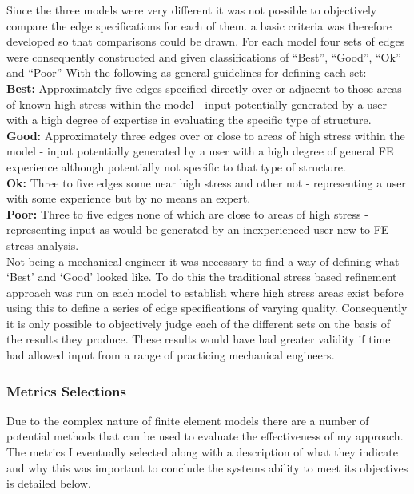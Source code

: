 \noindent
Since the three models were very different it was not possible to objectively compare the edge specifications for each of them. a basic criteria was therefore developed so that comparisons could be drawn. For each model four sets of edges were consequently constructed and given classifications of ``Best'', ``Good'', ``Ok'' and ``Poor'' With the following as general guidelines for defining each set: \\

\noindent
\textbf{Best: } Approximately five edges specified directly over or adjacent to those areas of known high stress within the model - input potentially generated by a user with a high degree of expertise in evaluating the specific type of structure. \\ 

\noindent
\textbf{Good: } Approximately three edges over or close to areas of high stress within the model - input potentially generated by a user with a high degree of general FE experience although potentially not specific to that type of structure. \\ 

\noindent
\textbf{Ok: } Three to five edges some near high stress and other not - representing a user with some experience but by no means an expert. \\ 

\noindent
\textbf{Poor: } Three to five edges none of which are close to areas of high stress - representing input as would be generated by an inexperienced user new to FE stress analysis. \\ 

\noindent
Not being a mechanical engineer it was necessary to find a way of defining what `Best' and `Good' looked like. To do this the traditional stress based refinement approach was run on each model to establish where high stress areas exist before using this to define a series of edge specifications of varying quality. Consequently it is only possible to objectively judge each of the different sets on the basis of the results they produce. These results would have had greater validity if time had allowed input from a range of practicing mechanical engineers. \\

\noindent
 
\subsubsection{Metrics Selections}
Due to the complex nature of finite element models there are a number of potential methods that can be used to evaluate the effectiveness of my approach. The metrics I eventually selected along with a description of what they indicate and why this was important to conclude the systems ability to meet its objectives is detailed below. \\ 

